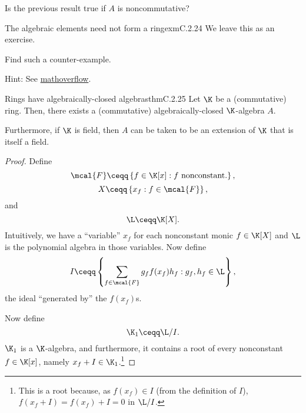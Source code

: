 \begin{exr}{}{}
	Is the previous result true if $A$ is noncommutative?
\end{exr}
\begin{exm}{The algebraic elements need not form a ring}{exmC.2.24}
	We leave this as an exercise.
	\begin{exr}[breakable=false]{}{}
		Find such a counter-example.
		\begin{rmk}
			Hint:  See \href{https://mathoverflow.net/questions/163749/algebraic-closure-of-a-ring-is-not-a-ring}{mathoverflow}.
		\end{rmk}
	\end{exr}
\end{exm}
\begin{thm}{Rings have algebraically-closed algebras}{thmC.2.25}
	Let $\K$ be a (commutative) ring.  Then, there exists a (commutative) algebraically-closed $\K$-algebra $A$.
	
	Furthermore, if $\K$ is field, then $A$ can be taken to be an extension of $\K$ that is itself a field.
	\begin{proof}
		Define
		\begin{equation}
			\mcal{F}\ceqq \left\{ f\in \K [x]:f\text{ nonconstant.}\right\} ,
		\end{equation}
		\begin{equation}
			X\ceqq \left\{ x_f:f\in \mcal{F}\right\} ,
		\end{equation}
			and
		\begin{equation}
			\L \ceqq \K [X].
		\end{equation}
		Intuitively, we have a ``variable'' $x_f$ for each nonconstant monic $f\in \K [X]$ and $\L$ is the polynomial algebra in those variables.  Now define
		\begin{equation}
			I\ceqq \left\{ \sum _{f\in \mcal{F}}g_ff(x_f)h_f:g_f,h_f\in \L \right\} ,
		\end{equation}
		the ideal ``generated by'' the $f(x_f)$s.
		
		Now define
		\begin{equation}\label{eqnC.2.31}
			\K _1\ceqq \L /I.
		\end{equation}
		$\K _1$ is a $\K$-algebra, and furthermore, it contains a root of every nonconstant $f\in \K [x]$, namely $x_f+I\in \K _1$.\footnote{This is a root because, as $f(x_f)\in I$ (from the definition of $I$), $f(x_f+I)=f(x_f)+I=0$ in $\L /I$.}
		

\end{proof}
\end{thm}
